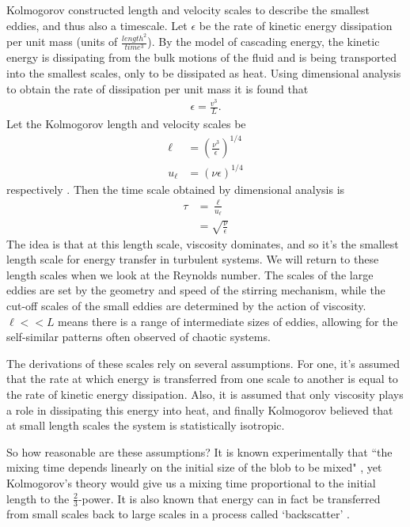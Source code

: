 \documentclass[a4paper,12pt]{article}
\begin{document}
Kolmogorov constructed length and velocity scales to describe the smallest eddies, and thus also a timescale. Let $\epsilon$ be the rate of kinetic energy dissipation per unit mass (units of $\frac{length^2}{time^3}$). By the model of cascading energy, the kinetic energy is dissipating from the bulk motions of the fluid and is being transported into the smallest scales, only to be dissipated as heat. Using dimensional analysis to obtain the rate of dissipation per unit mass  it is found that 
\begin{align}
\epsilon = \frac{v^3}{L}.
\end{align}Let the Kolmogorov length and velocity scales be
\begin{align}
\ell &= \left(\frac{\nu^3}{\epsilon}\right)^{1/4}\\
u_{\ell} &= (\nu\epsilon)^{1/4}
\end{align} respectively \citep[~p.47]{h99}. Then the time scale obtained by dimensional analysis is
\begin{align}
\tau &= \frac{\ell}{u_{\ell}}\\
&= \sqrt{\frac{\nu}{\epsilon}}
\end{align} The idea is that at this length scale, viscosity dominates, and so it's the smallest length scale for energy transfer in turbulent systems. We will return to these length scales when we look at the Reynolds number. The scales of the large eddies are set by the geometry and speed of the stirring mechanism, while the cut-off scales of the small eddies are determined by the action of viscosity. $\ell << L$ means there is a range of intermediate sizes of eddies, allowing for the self-similar patterns often observed of chaotic systems.

The derivations of these scales rely on several assumptions. For one, it's assumed that the rate at which energy is transferred from one scale to another is equal to the rate of kinetic energy dissipation. Also, it is assumed that only viscosity plays a role in dissipating this energy into heat, and finally Kolmogorov believed that at small length scales the system is statistically isotropic.

So how reasonable are these assumptions? It is known experimentally that ``the mixing time depends linearly on the initial size of the blob to be mixed" \citep[~p.4]{vcc99}, yet Kolmogorov's theory would give us a mixing time proportional to the initial length to the $\frac{2}{3}$-power. It is also known that energy can in fact be transferred from small scales back to large scales in a process called `backscatter' \citep[~p.606]{cgm95}. 
\end{document}
